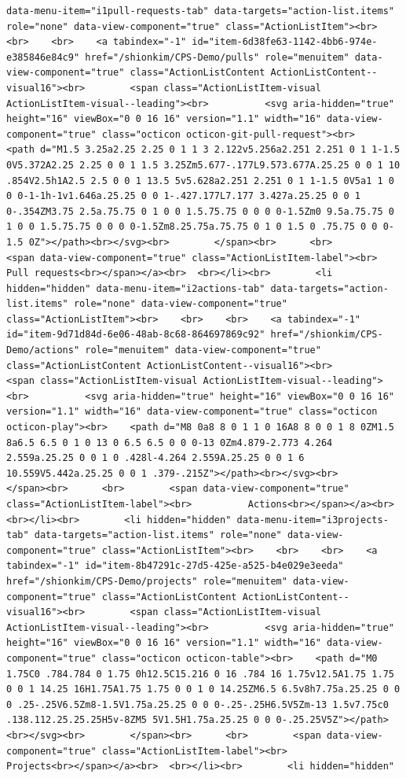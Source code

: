 \documentclass[
  letterpaper,
]{book}
\begin{document}
\begin{verbatim}
data-menu-item="i1pull-requests-tab" data-targets="action-list.items" role="none" data-view-component="true" class="ActionListItem"><br>    <br>    <br>    <a tabindex="-1" id="item-6d38fe63-1142-4bb6-974e-e385846e84c9" href="/shionkim/CPS-Demo/pulls" role="menuitem" data-view-component="true" class="ActionListContent ActionListContent--visual16"><br>        <span class="ActionListItem-visual ActionListItem-visual--leading"><br>          <svg aria-hidden="true" height="16" viewBox="0 0 16 16" version="1.1" width="16" data-view-component="true" class="octicon octicon-git-pull-request"><br>    <path d="M1.5 3.25a2.25 2.25 0 1 1 3 2.122v5.256a2.251 2.251 0 1 1-1.5 0V5.372A2.25 2.25 0 0 1 1.5 3.25Zm5.677-.177L9.573.677A.25.25 0 0 1 10 .854V2.5h1A2.5 2.5 0 0 1 13.5 5v5.628a2.251 2.251 0 1 1-1.5 0V5a1 1 0 0 0-1-1h-1v1.646a.25.25 0 0 1-.427.177L7.177 3.427a.25.25 0 0 1 0-.354ZM3.75 2.5a.75.75 0 1 0 0 1.5.75.75 0 0 0 0-1.5Zm0 9.5a.75.75 0 1 0 0 1.5.75.75 0 0 0 0-1.5Zm8.25.75a.75.75 0 1 0 1.5 0 .75.75 0 0 0-1.5 0Z"></path><br></svg><br>        </span><br>      <br>        <span data-view-component="true" class="ActionListItem-label"><br>          Pull requests<br></span></a><br>  <br></li><br>        <li hidden="hidden" data-menu-item="i2actions-tab" data-targets="action-list.items" role="none" data-view-component="true" class="ActionListItem"><br>    <br>    <br>    <a tabindex="-1" id="item-9d71d84d-6e06-48ab-8c68-864697869c92" href="/shionkim/CPS-Demo/actions" role="menuitem" data-view-component="true" class="ActionListContent ActionListContent--visual16"><br>        <span class="ActionListItem-visual ActionListItem-visual--leading"><br>          <svg aria-hidden="true" height="16" viewBox="0 0 16 16" version="1.1" width="16" data-view-component="true" class="octicon octicon-play"><br>    <path d="M8 0a8 8 0 1 1 0 16A8 8 0 0 1 8 0ZM1.5 8a6.5 6.5 0 1 0 13 0 6.5 6.5 0 0 0-13 0Zm4.879-2.773 4.264 2.559a.25.25 0 0 1 0 .428l-4.264 2.559A.25.25 0 0 1 6 10.559V5.442a.25.25 0 0 1 .379-.215Z"></path><br></svg><br>        </span><br>      <br>        <span data-view-component="true" class="ActionListItem-label"><br>          Actions<br></span></a><br>  <br></li><br>        <li hidden="hidden" data-menu-item="i3projects-tab" data-targets="action-list.items" role="none" data-view-component="true" class="ActionListItem"><br>    <br>    <br>    <a tabindex="-1" id="item-8b47291c-27d5-425e-a525-b4e029e3eeda" href="/shionkim/CPS-Demo/projects" role="menuitem" data-view-component="true" class="ActionListContent ActionListContent--visual16"><br>        <span class="ActionListItem-visual ActionListItem-visual--leading"><br>          <svg aria-hidden="true" height="16" viewBox="0 0 16 16" version="1.1" width="16" data-view-component="true" class="octicon octicon-table"><br>    <path d="M0 1.75C0 .784.784 0 1.75 0h12.5C15.216 0 16 .784 16 1.75v12.5A1.75 1.75 0 0 1 14.25 16H1.75A1.75 1.75 0 0 1 0 14.25ZM6.5 6.5v8h7.75a.25.25 0 0 0 .25-.25V6.5Zm8-1.5V1.75a.25.25 0 0 0-.25-.25H6.5V5Zm-13 1.5v7.75c0 .138.112.25.25.25H5v-8ZM5 5V1.5H1.75a.25.25 0 0 0-.25.25V5Z"></path><br></svg><br>        </span><br>      <br>        <span data-view-component="true" class="ActionListItem-label"><br>          Projects<br></span></a><br>  <br></li><br>        <li hidden="hidden" 
\end{verbatim}
\end{document}

